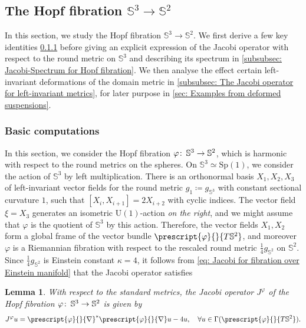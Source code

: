 \documentclass{article}
\numberwithin{equation}{section}        %
\theoremstyle{bfnote}
\newtheorem{lem}[thm]{Lemma}                %
\theoremstyle{definition}
\theoremstyle{bfremark}
\newcommand{\col}{\colon \thinspace}        %
\newcommand{\Sp}{\mathbb{S}}                %
\begin{document}
    \subsection{The Hopf fibration $\mathbb{S}^3 \rightarrow \mathbb{S}^2$}     \label{subsec: Hopf fibration as model map}

In this section, we study the Hopf fibration $\Sp^3 \to \Sp^2$. We first derive a few key identities \cref{subsubsec: Computations for Hopf fibration} before giving an explicit expression of the Jacobi operator with respect to the round metric on $\Sp^3$ and describing its spectrum in \cref{subsubsec: Jacobi-Spectrum for Hopf fibration}. We then analyse the effect certain left-invariant deformations of the domain metric in \cref{subsubsec: The Jacobi operator for left-invariant metrics}, for later purpose in \cref{sec: Examples from deformed suspensions}.

    
    \subsubsection{Basic computations} \label{subsubsec: Computations for Hopf fibration}

In this section, we consider the Hopf fibration $\varphi \col \Sp^3 \rightarrow \Sp^2$, which is harmonic with respect to the round metrics on the spheres. On $\Sp^3 \simeq \mathrm{Sp}(1)$, we consider the action of $\Sp^3$ by left multiplication. There is an orthonormal basis $X_1,X_2,X_3$ of left-invariant vector fields for the round metric $g_{1} \coloneqq g_{\Sp^3}$ with constant sectional curvature $1$, such that $[X_i,X_{i+1}] = 2 X_{i+2}$ with cyclic indices. The vector field $\xi = X_3$ generates an isometric $\mathrm{U}(1)$-action \emph{on the right}, and we might assume that $\varphi$ is the quotient of $\Sp^3$ by this action. Therefore, the vector fields $X_1,X_2$ form a global frame of the vector bundle $\prescript{\varphi}{}{T\Sp^2}$, and moreover $\varphi$ is a Riemannian fibration with respect to the rescaled round metric $\tfrac{1}{4}g_{\Sp^2}$ on $\Sp^2$. Since $\tfrac{1}{4}g_{\Sp^2}$ is Einstein constant $\kappa = 4$, it follows from \eqref{eq: Jacobi for fibration over Einstein manifold} that the Jacobi operator satisfies

\begin{lem}
    With respect to the standard metrics, the Jacobi operator $J^\varphi$ of the Hopf fibration $\varphi \col \Sp^3 \rightarrow \Sp^2$ is given by
    \begin{equation*}
        J^\varphi u = \prescript{\varphi}{}{\nabla}^* \prescript{\varphi}{}{\nabla} u - 4 u, ~~~ \forall u \in \Gamma (\prescript{\varphi}{}{T\Sp^2}) .
    \end{equation*}
\end{lem}
\end{document}
